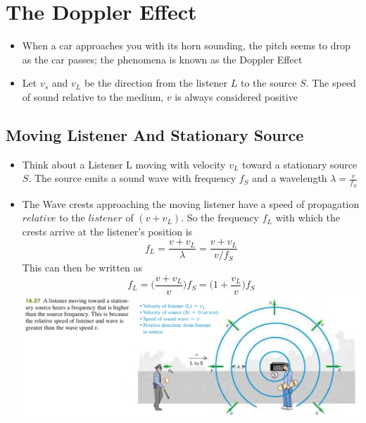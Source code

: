 \documentclass[11pt, a4paper]{article}
\begin{document}
\section[16.8, The Doppler Effect]{The Doppler Effect}
\begin{itemize}
   \item When a car approaches you with its horn sounding, the pitch seems to drop as
       the car passes; the phenomena is known as the Doppler Effect
   \item Let $v_s$ and $v_L$ be the direction from the listener $L$ to the source $S$.
       The speed of sound relative to the medium, $v$ is always considered positive
\end{itemize}
\subsection{Moving Listener And Stationary Source}
\begin{itemize}
    \item Think about a Listener L moving with velocity $v_L$ toward a stationary source
        $S$. The source emits a sound wave with frequency $f_S$ and a wavelength
        $\lambda = \frac{v}{f_S}$
    \item The Wave crests approaching the moving listener have a speed of propagation
        $relative$ to the $listener$ of $(v+v_L)$. So the frequency $f_L$ with which the
        crests arrive at the listener's position is
        \begin{equation}
            f_L = \frac{v+v_L}{\lambda} = \frac{v+v_L}{v / f_S}
        \end{equation}
        This can then be written as
        \begin{equation}
            f_L = \bigg(\frac{v+v_L}{v}\bigg)f_S = \bigg(1 + \frac{v_L}{v}\bigg)f_S
        \end{equation}
        \includegraphics[scale=0.65]{images/doppler_effect.png}
\end{itemize}
\end{document}
